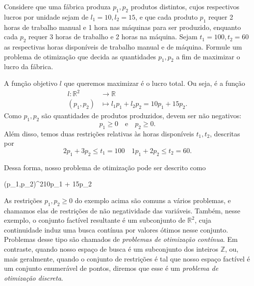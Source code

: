 \begin{exemplo}\label{ex:custoproducao}
	Considere que uma fábrica produza $p_1,p_2$ produtos distintos, cujos respectivos lucros por unidade sejam de $l_1 = 10,l_2 = 15$, e que cada produto $p_1$ requer 2 horas de trabalho manual e 1 hora nas máquinas para ser produzido, enquanto cada $p_2$ requer 3 horas de trabalho e 2 horas na máquina. Sejam $t_1 = 100, t_2 = 60$ as respectivas horas disponíveis de trabalho manual e de máquina. Formule um problema de otimização que decida as quantidades $p_1,p_2$ a fim de maximizar o lucro da fábrica.

	\begin{solucao}
		A função objetivo $l$ que queremos maximizar é o lucro total. Ou seja, é a função
		\begin{align*}
			l: \mathbb{R}^2 &\to  \mathbb{R}\\
			(p_1,p_2) &\mapsto l_1p_1 + l_2p_2 = 10p_1 + 15p_2.
		\end{align*}
		Como $p_1,p_2$ são quantidades de produtos produzidos, devem ser não negativos: $$p_1\geq0 \quad \text{e}\quad p_2 \geq 0.$$ Além disso, temos duas restrições relativas às horas disponíveis $t_1,t_2$, descritas por $$2p_1 + 3p_2 \leq t_1 = 100 \quad 1p_1 + 2p_2 \leq t_2 = 60.$$ 

		Dessa forma, nosso problema de otimização pode ser descrito como
		\begin{maxi}
			{(p_1,p_2)\in {}^2}{10p_1 + 15p_2}{}{}
		\end{maxi}
	\end{solucao}
\end{exemplo}

As restrições $p_1,p_2\geq 0$ do exemplo acima são comuns a vários problemas, e chamamos elas de restrições de não negatividade das variáveis. Também, nesse exemplo, o conjunto factível resultante é um subconjunto de $\mathbb{R}^2$, cuja continuidade induz uma busca contínua por valores ótimos nesse conjunto. Problemas desse tipo são chamados de \textit{problemas de otimização contínua}. Em contraste, quando nosso espaço de busca é um subconjunto dos inteiros $\mathbb{Z}$, ou, mais geralmente, quando o conjunto de restrições é tal que nosso espaço factível é um conjunto enumerável de pontos, diremos que esse é um \textit{problema de otimização discreta}.


